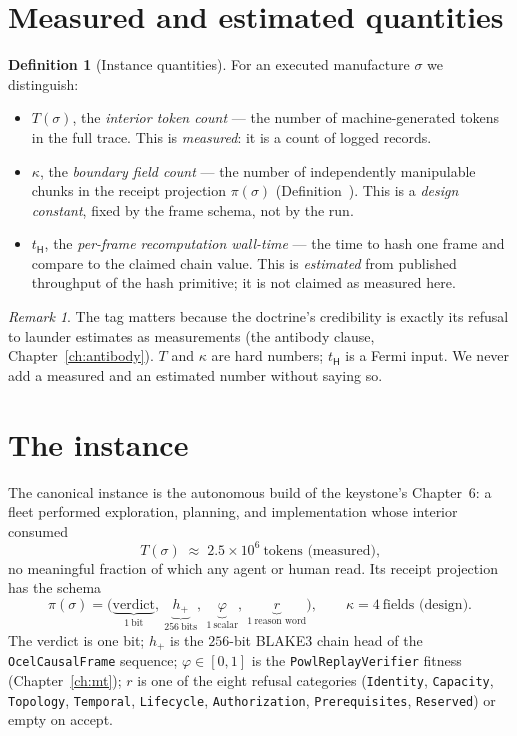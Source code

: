 \documentclass[11pt,oneside]{book}
\theoremstyle{definition}
\newtheorem{definition}{Definition}[chapter]
\theoremstyle{plain}
\theoremstyle{remark}
\newtheorem*{remark}{Remark}
\newcommand{\Proj}{\pi}                        %
\newcommand{\chainH}{\mathsf{H}}               %
\newcommand{\CL}{\kappa}                       %
\newcommand{\Fitness}{\varphi}
\newcommand{\code}[1]{\texttt{#1}}
\begin{document}
\section{Measured and estimated quantities}

\begin{definition}[Instance quantities]\label{def:instance-q}
For an executed manufacture $\sigma$ we distinguish:
\begin{itemize}[leftmargin=*]
\item $T(\sigma)$, the \emph{interior token count} --- the number of machine-generated tokens in
the full trace. This is \emph{measured}: it is a count of logged records.
\item $\CL$, the \emph{boundary field count} --- the number of independently manipulable chunks
in the receipt projection $\Proj(\sigma)$ (Definition~\cite[Def.~3.1]{keystone}). This is a
\emph{design constant}, fixed by the frame schema, not by the run.
\item $t_{\chainH}$, the \emph{per-frame recomputation wall-time} --- the time to hash one frame
and compare to the claimed chain value. This is \emph{estimated} from published throughput of
the hash primitive; it is not claimed as measured here.
\end{itemize}
\end{definition}

\begin{remark}
The tag matters because the doctrine's credibility is exactly its refusal to launder estimates
as measurements (the antibody clause, Chapter~\ref{ch:antibody}). $T$ and $\CL$ are hard
numbers; $t_{\chainH}$ is a Fermi input. We never add a measured and an estimated number without
saying so.
\end{remark}

\section{The instance}

The canonical instance is the autonomous build of the keystone's Chapter~6: a fleet performed
exploration, planning, and implementation whose interior consumed
\[
T(\sigma)\;\approx\;2.5\times 10^{6}\ \text{tokens (measured),}
\]
no meaningful fraction of which any agent or human read. Its receipt projection has the schema
\[
\Proj(\sigma)=\bigl(\underbrace{\text{verdict}}_{1\ \text{bit}},\ \underbrace{h_{+}}_{256\ \text{bits}},\ \underbrace{\Fitness}_{1\ \text{scalar}},\ \underbrace{r}_{1\ \text{reason word}}\bigr),
\qquad \CL=4\ \text{fields (design).}
\]
The verdict is one bit; $h_{+}$ is the $256$-bit BLAKE3 \cite{blake3} chain head of the
\code{OcelCausalFrame} sequence; $\Fitness\in[0,1]$ is the \code{PowlReplayVerifier} fitness
(Chapter~\ref{ch:mt}); $r$ is one of the eight refusal categories (\code{Identity},
\code{Capacity}, \code{Topology}, \code{Temporal}, \code{Lifecycle}, \code{Authorization},
\code{Prerequisites}, \code{Reserved}) or empty on accept.
\end{document}
